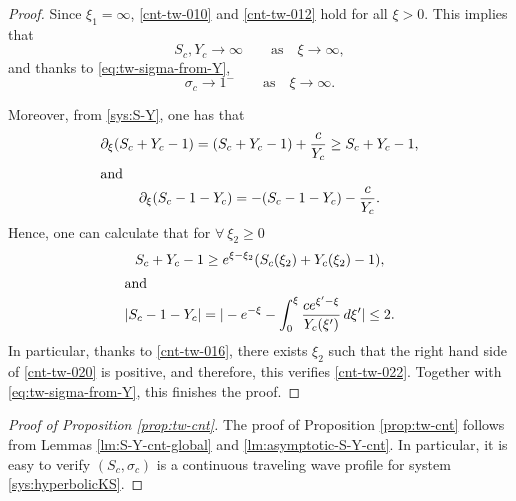 \documentclass[12pt]{article}
\theoremstyle{definition}
\theoremstyle{remark}
\numberwithin{equation}{section}
\begin{document}
\begin{proof}
Since $ \xi_1 = \infty $, \eqref{cnt-tw-010} and \eqref{cnt-tw-012} hold for all $ \xi > 0 $. This implies that 
\begin{equation}
    \label{cnt-tw-016}
    S_c, Y_c \rightarrow \infty \qquad \text{as} \quad \xi \to \infty,
\end{equation}
and thanks to \eqref{eq:tw-sigma-from-Y},
\begin{equation}
    \label{cnt-tw-017}
    \sigma_c \rightarrow 1^- \qquad \text{as} \quad \xi \to \infty.
\end{equation}

Moreover, from \eqref{sys:S-Y}, one has that
\begin{gather}
\label{cnt-tw-018}
    \partial_\xi (S_c + Y_c - 1 ) = (S_c + Y_c - 1) + \frac{c}{Y_c} \geq S_c + Y_c - 1,\\
    \intertext{and}
    \label{cnt-tw-019}
    \partial_\xi(S_c- 1 - Y_c) = - (S_c- 1 - Y_c) - \frac{c}{Y_c}.
\end{gather}
Hence, one can calculate that for $ \forall \ \xi_2 \geq 0 $
\begin{gather}
\label{cnt-tw-020}
    S_c + Y_c - 1 \geq e^{\xi - \xi_2} (S_c(\xi_2) + Y_c(\xi_2) - 1 ),  \\
    \intertext{and}
\label{cnt-tw-021}
\vert S_c - 1 - Y_c \vert = \vert - e^{-\xi} - \int_0^\xi \frac{c e^{\xi'-\xi}}{Y_c(\xi')}\,d\xi' \vert \leq 2.
\end{gather}
In particular, thanks to \eqref{cnt-tw-016}, there exists $ \xi_2 $ such that the right hand side of \eqref{cnt-tw-020} is positive, and therefore, this verifies \eqref{cnt-tw-022}. Together with \eqref{eq:tw-sigma-from-Y}, this finishes the proof. 
\end{proof}

\begin{proof}[Proof of Proposition \ref{prop:tw-cnt}]
    The proof of Proposition \ref{prop:tw-cnt} follows from Lemmas \ref{lm:S-Y-cnt-global} and \ref{lm:asymptotic-S-Y-cnt}. In particular, it is easy to verify $(S_c, \sigma_c)$ is a continuous traveling wave profile for system \eqref{sys:hyperbolicKS}.
\end{proof}


\end{document}

